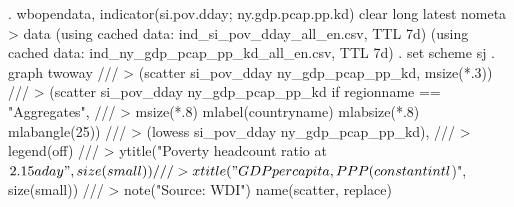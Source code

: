 . wbopendata, indicator(si.pov.dday; ny.gdp.pcap.pp.kd) clear long latest nometa
> data
(using cached data: ind_si_pov_dday_all_en.csv, TTL 7d)
(using cached data: ind_ny_gdp_pcap_pp_kd_all_en.csv, TTL 7d)
{\smallskip}
. set scheme sj
{\smallskip}
. graph twoway ///
>     (scatter si_pov_dday ny_gdp_pcap_pp_kd, msize(*.3)) ///
>     (scatter si_pov_dday ny_gdp_pcap_pp_kd if regionname == "Aggregates", ///
>         msize(*.8) mlabel(countryname) mlabsize(*.8) mlabangle(25)) ///
>     (lowess si_pov_dday ny_gdp_pcap_pp_kd), ///
>         legend(off) ///
>         ytitle("Poverty headcount ratio at $2.15 a day", size(small)) ///
>         xtitle("GDP per capita, PPP (constant intl $)", size(small)) ///
>         note("Source: WDI") name(scatter, replace)
